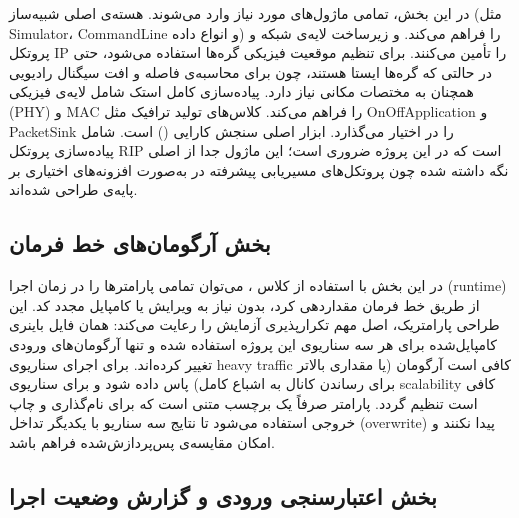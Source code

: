 \documentclass{article}
\begin{document}
	در این بخش، تمامی ماژول‌های مورد نیاز  وارد می‌شوند.  هسته‌ی اصلی شبیه‌ساز (مثل Simulator، CommandLine و انواع داده) را فراهم می‌کند.  و  زیرساخت لایه‌ی شبکه و پروتکل IP را تأمین می‌کنند.  برای تنظیم موقعیت فیزیکی گره‌ها استفاده می‌شود، حتی در حالتی که گره‌ها ایستا هستند، چون  برای محاسبه‌ی فاصله و افت سیگنال رادیویی همچنان به مختصات مکانی نیاز دارد.  پیاده‌سازی کامل استک  شامل لایه‌ی فیزیکی (PHY) و MAC را فراهم می‌کند.  کلاس‌های تولید ترافیک مثل OnOffApplication و PacketSink را در اختیار می‌گذارد.  ابزار اصلی سنجش کارایی () است.  شامل پیاده‌سازی پروتکل RIP است که در این پروژه ضروری است؛ این ماژول جدا از  اصلی نگه داشته شده چون پروتکل‌های مسیریابی پیشرفته
	  در 
	به‌صورت افزونه‌های اختیاری بر پایه‌ی
	طراحی شده‌اند.
	
	\subsection{بخش آرگومان‌های خط فرمان}
	
	\lr{}
	
	در این بخش با استفاده از کلاس ، می‌توان تمامی پارامترها را در زمان اجرا (runtime) از طریق خط فرمان مقداردهی کرد، بدون نیاز به ویرایش یا کامپایل مجدد کد. این طراحی پارامتریک، اصل مهم تکرارپذیری آزمایش 
	 را رعایت می‌کند: همان فایل باینری کامپایل‌شده برای هر سه سناریوی این پروژه استفاده شده و تنها آرگومان‌های ورودی تغییر کرده‌اند. برای اجرای سناریوی heavy traffic کافی است آرگومان  (یا مقداری بالاتر برای رساندن کانال به اشباع کامل) پاس داده شود و برای سناریوی scalability کافی است  تنظیم گردد. پارامتر  صرفاً یک برچسب متنی است که برای نام‌گذاری و چاپ خروجی استفاده می‌شود تا نتایج سه سناریو با یکدیگر تداخل (overwrite) پیدا نکنند و امکان مقایسه‌ی پس‌پردازش‌شده فراهم باشد.
	
	\subsection{بخش اعتبارسنجی ورودی و گزارش وضعیت اجرا}
	
\end{document}
